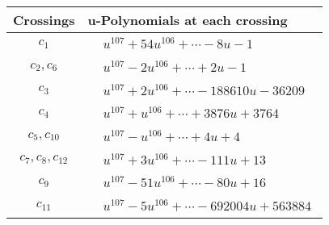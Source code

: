 \documentclass[1p]{elsarticle_modified}
\theoremstyle{definition}
\begin{document}
\begin{tabular}{m{50pt}|m{274pt}}
Crossings & \hspace{64pt}u-Polynomials at each crossing \\
\hline $$\begin{aligned}c_{1}\end{aligned}$$&$\begin{aligned}
&u^{107}+54 u^{106}+\cdots-8 u-1
\end{aligned}$\\
\hline $$\begin{aligned}c_{2},c_{6}\end{aligned}$$&$\begin{aligned}
&u^{107}-2 u^{106}+\cdots+2 u-1
\end{aligned}$\\
\hline $$\begin{aligned}c_{3}\end{aligned}$$&$\begin{aligned}
&u^{107}+2 u^{106}+\cdots-188610 u-36209
\end{aligned}$\\
\hline $$\begin{aligned}c_{4}\end{aligned}$$&$\begin{aligned}
&u^{107}+u^{106}+\cdots+3876 u+3764
\end{aligned}$\\
\hline $$\begin{aligned}c_{5},c_{10}\end{aligned}$$&$\begin{aligned}
&u^{107}- u^{106}+\cdots+4 u+4
\end{aligned}$\\
\hline $$\begin{aligned}c_{7},c_{8},c_{12}\end{aligned}$$&$\begin{aligned}
&u^{107}+3 u^{106}+\cdots-111 u+13
\end{aligned}$\\
\hline $$\begin{aligned}c_{9}\end{aligned}$$&$\begin{aligned}
&u^{107}-51 u^{106}+\cdots-80 u+16
\end{aligned}$\\
\hline $$\begin{aligned}c_{11}\end{aligned}$$&$\begin{aligned}
&u^{107}-5 u^{106}+\cdots-692004 u+563884
\end{aligned}$\\
\hline
\end{tabular}\\~\\
\end{document}
